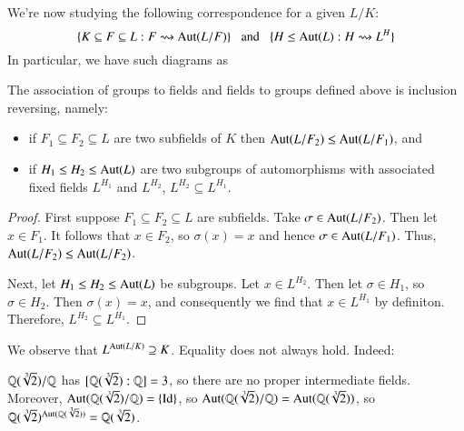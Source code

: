 We're now studying the following correspondence for a given $L/K$:\begin{equation*}
    \{K\subseteq F\subseteq L:F\rightsquigarrow \operatorname{Aut}(L/F)\}\;\;\text{ and }\;\;\{H\leq \operatorname{Aut}(L):H\rightsquigarrow L^H\}
\end{equation*}
In particular, we have such diagrams as 
\begin{center}
\end{center}

\begin{prop}
    The association of groups to fields and fields to groups defined above is inclusion reversing, namely: \begin{itemize}
        \item if $F_1\subseteq F_2\subseteq L$ are two subfields of $K$ then $\operatorname{Aut}(L/F_2) \leq \operatorname{Aut}(L/F_1)$, and
        \item if $H_1 \leq H_2 \leq \operatorname{Aut}(L)$ are two subgroups of automorphisms with associated fixed fields $L^{H_1}$ and $L^{H_2}$, $L^{H_2} \subseteq L^{H_1}$.
    \end{itemize}
\end{prop}
\begin{proof}
    First suppose $F_1 \subseteq F_2 \subseteq L$ are subfields. Take $\sigma \in \operatorname{Aut}(L/F_2)$. Then let $x \in F_1$. It follows that $x \in F_2$, so $\sigma(x) = x$ and hence $\sigma \in \operatorname{Aut}(L/F_1)$. Thus, $\operatorname{Aut}(L/F_2) \leq \operatorname{Aut}(L/F_2)$.

    Next, let $H_1 \leq H_2 \leq \operatorname{Aut}(L)$ be subgroups. Let $x \in L^{H_2}$. Then let $\sigma \in H_1$, so $\sigma \in H_2$. Then $\sigma(x) = x$, and consequently we find that $x \in L^{H_1}$ by definiton. Therefore, $L^{H_2} \subseteq L^{H_1}$.
\end{proof}

We observe that $L^{\operatorname{Aut}(L/K)} \supseteq K$. Equality does not always hold. Indeed:

\begin{eg}
    $\mathbb Q(\sqrt[3]{2})/\mathbb Q$ has $[\mathbb Q(\sqrt[3]{2}):\mathbb Q] = 3$, so there are no proper intermediate fields. Moreover, $\operatorname{Aut}(\mathbb Q(\sqrt[3]{2})/\mathbb Q) = \{\operatorname{Id}\}$, so $\operatorname{Aut}(\mathbb Q(\sqrt[3]{2})/\mathbb Q) = \operatorname{Aut}(\mathbb Q(\sqrt[3]{2}))$, so $\mathbb Q(\sqrt[3]{2})^{\operatorname{Aut}(\mathbb Q(\sqrt[3]{2}))} = \mathbb Q(\sqrt[3]{2})$.
\end{eg}

